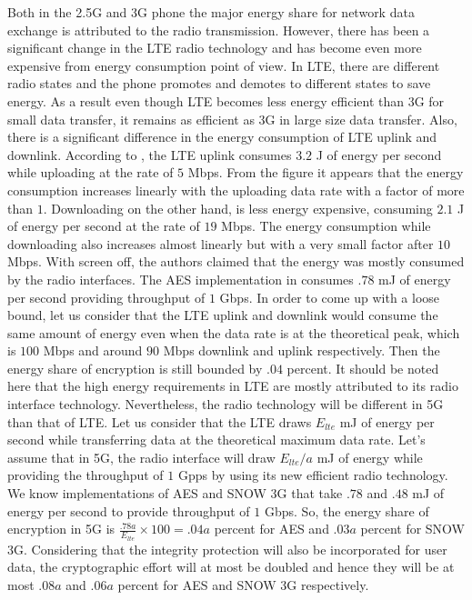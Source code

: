 \documentclass[lnicst,sechang,a4paper]{svmultln}
\begin{document}
Both in the 2.5G and 3G phone the major energy share for network data exchange is attributed to the radio transmission. However, there has been a significant change in the LTE radio technology and has become even more expensive from energy consumption point of view. In LTE, there are different radio states and the phone promotes and demotes to different states to save energy. As a result even though LTE becomes less energy efficient than 3G for small data transfer, it remains as efficient as 3G in large size data transfer. Also, there is a significant difference in the energy consumption of LTE uplink and downlink. According to \cite[Fig 9]{Mobisys_2012}, the LTE uplink consumes $3.2$ J of energy per second while uploading at the rate of $5$ Mbps. From the figure it appears that the energy consumption increases linearly with the uploading data rate with a factor of more than $1$. Downloading on the other hand, is less energy expensive, consuming $2.1$ J of energy per second at the rate of $19$ Mbps. The energy consumption while downloading also increases almost linearly but with a very small factor after $10$ Mbps. With screen off, the authors claimed that the energy was mostly consumed by the radio interfaces. The AES implementation in \cite{Ruhr_2011} consumes $.78$ mJ of energy per second providing throughput of $1$ Gbps. In order to come up with a loose bound, let us consider that the LTE uplink and downlink would consume the same amount of energy even when the data rate is at the theoretical peak, which is $100$ Mbps and around $90$ Mbps downlink and uplink respectively. Then the energy share of encryption is still bounded by $.04$ percent. It should be noted here that the high energy requirements in LTE are mostly attributed to its radio interface technology. Nevertheless, the radio technology will be different in 5G than that of LTE. Let us consider that the LTE draws $E_{lte}$ mJ of energy per second while transferring data at the theoretical maximum data rate. Let's assume that in 5G, the radio interface will draw $E_{lte}/a$ mJ of energy while providing the throughput of $1$ Gpps by using its new efficient radio technology. We know implementations of AES and SNOW 3G that take $.78$ and $.48$ mJ of energy per second to provide throughput of $1$ Gbps. So, the energy share of encryption in 5G is $\frac{.78a}{E_{lte}}\times 100 = .04a$ percent for AES and $.03a$ percent for SNOW 3G. Considering that the integrity protection will also be incorporated for user data, the cryptographic effort will at most be doubled and hence they will be at most $.08a$ and $.06a$ percent for AES and SNOW 3G respectively. 
\end{document}
